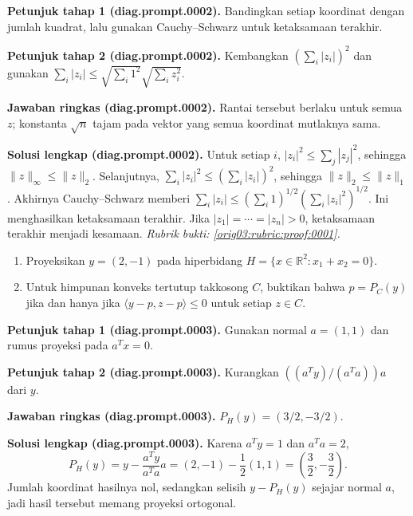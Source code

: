\par\noindent\textbf{Petunjuk tahap 1 (diag.prompt.0002).}
Bandingkan setiap koordinat dengan jumlah kuadrat, lalu gunakan
Cauchy--Schwarz untuk ketaksamaan terakhir.
\label{orig03:diag:hint1:0002}
\par\noindent\textbf{Petunjuk tahap 2 (diag.prompt.0002).}
Kembangkan $(\sum_i|z_i|)^2$ dan gunakan
$\sum_i|z_i|\leq\sqrt{\sum_i1^2}\sqrt{\sum_i z_i^2}$.
\label{orig03:diag:hint2:0002}
\par\noindent\textbf{Jawaban ringkas (diag.prompt.0002).}
Rantai tersebut berlaku untuk semua $z$; konstanta $\sqrt n$ tajam pada
vektor yang semua koordinat mutlaknya sama.
\label{orig03:diag:answer:0002}
\par\noindent\textbf{Solusi lengkap (diag.prompt.0002).}
Untuk setiap $i$, $|z_i|^2\leq\sum_j|z_j|^2$, sehingga
$\lVert z\rVert_\infty\leq\lVert z\rVert_2$. Selanjutnya,
$\sum_i|z_i|^2\leq(\sum_i|z_i|)^2$, sehingga
$\lVert z\rVert_2\leq\lVert z\rVert_1$. Akhirnya Cauchy--Schwarz memberi
$\sum_i|z_i|\leq(\sum_i1)^{1/2}(\sum_i|z_i|^2)^{1/2}$.
Ini menghasilkan ketaksamaan terakhir. Jika $|z_1|=\cdots=|z_n|>0$,
ketaksamaan terakhir menjadi kesamaan.
\emph{Rubrik bukti: \ref{orig03:rubric:proof:0001}.}
\label{orig03:diag:solution:0002}

\begin{exercise}
\label{orig03:diag:problem:0002}
\begin{enumerate}
\item\label{orig03:diag:prompt:0003}
Proyeksikan $y=(2,-1)$ pada hiperbidang
$H=\{x\in\mathbb{R}^2:x_1+x_2=0\}$.
\item\label{orig03:diag:prompt:0004}
Untuk himpunan konveks tertutup takkosong $C$, buktikan bahwa
$p=P_C(y)$ jika dan hanya jika
$\langle y-p,z-p\rangle\leq0$ untuk setiap $z\in C$.
\end{enumerate}
\end{exercise}

\par\noindent\textbf{Petunjuk tahap 1 (diag.prompt.0003).}
Gunakan normal $a=(1,1)$ dan rumus proyeksi pada $a^Tx=0$.
\label{orig03:diag:hint1:0003}
\par\noindent\textbf{Petunjuk tahap 2 (diag.prompt.0003).}
Kurangkan $((a^Ty)/(a^Ta))a$ dari $y$.
\label{orig03:diag:hint2:0003}
\par\noindent\textbf{Jawaban ringkas (diag.prompt.0003).}
$P_H(y)=(3/2,-3/2)$.
\label{orig03:diag:answer:0003}
\par\noindent\textbf{Solusi lengkap (diag.prompt.0003).}
Karena $a^Ty=1$ dan $a^Ta=2$,
\[
P_H(y)=y-\frac{a^Ty}{a^Ta}a=(2,-1)-\frac12(1,1)
=\left(\frac32,-\frac32\right).
\]
Jumlah koordinat hasilnya nol, sedangkan selisih $y-P_H(y)$ sejajar normal
$a$, jadi hasil tersebut memang proyeksi ortogonal.
\label{orig03:diag:solution:0003}

